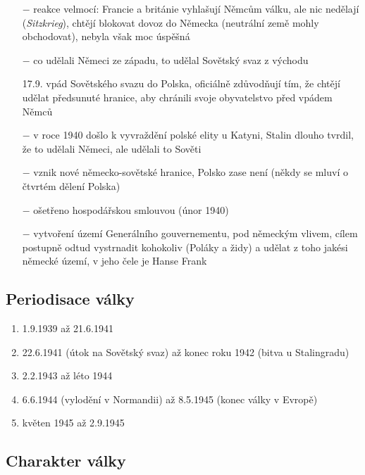 \documentclass{article}
\begin{document}
\begin{itemize}
    \item[$-$] reakce velmocí: Francie a británie vyhlašují Němcům válku, ale nic nedělají (\textit{Sitzkrieg}), chtějí blokovat dovoz do Německa (neutrální země mohly obchodovat), nebyla však moc úspěšná
    \item[$-$] co udělali Němeci ze západu, to udělal Sovětský svaz z východu
    \item[17.9.] vpád Sovětského svazu do Polska, oficiálně zdůvodňují tím, že chtějí udělat předsunuté hranice, aby chránili svoje obyvatelstvo před vpádem Němců
    \item[$-$] v roce 1940 došlo k vyvraždění polské elity u Katyni, Stalin dlouho tvrdil, že to udělali Němeci, ale udělali to Sověti
    \item[$-$] vznik nové německo-sovětské hranice, Polsko zase není (někdy se mluví o čtvrtém dělení Polska)
    \item[$-$] ošetřeno hospodářskou smlouvou (únor 1940)
    \item[$-$] vytvoření území Generálního gouvernementu, pod německým vlivem, cílem postupně odtud vystrnadit kohokoliv (Poláky a židy) a udělat z toho jakési německé území, v jeho čele je Hanse Frank

\end{itemize}

\subsection*{Periodisace války}
\begin{enumerate}
    \vspace{-0.5em}
    \setlength\itemsep{0.15em}
    \item 1.9.1939 až 21.6.1941
    \item 22.6.1941 (útok na Sovětský svaz) až konec roku 1942 (bitva u Stalingradu)
    \item 2.2.1943 až léto 1944
    \item 6.6.1944 (vylodění v Normandii) až 8.5.1945 (konec války v Evropě)
    \item květen 1945 až 2.9.1945
\end{enumerate}

\subsection*{Charakter války}
\end{document}
